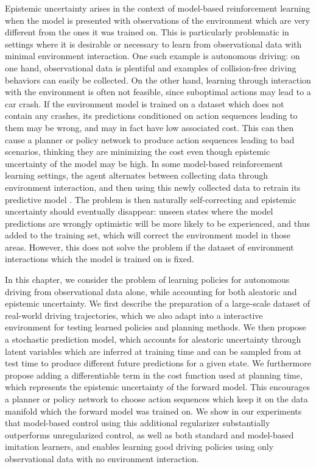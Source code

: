 \documentclass{article} %
\begin{document}
Epistemic uncertainty arises in the context of model-based reinforcement learning when the model is presented with observations of the environment which are very different from the ones it was trained on.
This is particularly problematic in settings where it is desirable or necessary to learn from observational data with minimal environment interaction.
One such example is autonomous driving: on one hand, observational data is plentiful and examples of collision-free driving behaviors can easily be collected.
On the other hand, learning through interaction with the environment is often not feasible, since suboptimal actions may lead to a car crash.
If the environment model is trained on a dataset which does not contain any crashes, its predictions conditioned on action sequences leading to them may be wrong, and may in fact have low associated cost.
This can then cause a planner or policy network to produce action sequences leading to bad scenarios, thinking they are minimizing the cost even though epistemic uncertainty of the model may be high.
In some model-based reinforcement learning settings, the agent alternates between collecting data through environment interaction, and then using this newly collected data to retrain its predictive model \citep{Dyna, PILCO}.
The problem is then naturally self-correcting and epistemic uncertainty should eventually disappear: unseen states where the model predictions are wrongly optimistic will be more likely to be experienced, and thus added to the training set, which will correct the environment model in those areas. However, this does not solve the problem if the dataset of environment interactions which the model is trained on is fixed.

In this chapter, we consider the problem of learning policies for autonomous driving from observational data alone, while accounting for both aleatoric and epistemic uncertainty.
We first describe the preparation of a large-scale dataset of real-world driving trajectories, which we also adapt into a interactive environment for testing learned policies and planning methods.
We then propose a stochastic prediction model, which accounts for aleatoric uncertainty through latent variables which are inferred at training time and can be sampled from at test time to produce different future predictions for a given state.
We furthermore propose adding a differentiable term in the cost function used at planning time, which represents the epistemic uncertainty of the forward model.
This encourages a planner or policy network to choose action sequences which keep it on the data manifold which the forward model was trained on.
We show in our experiments that model-based control using this additional regularizer substantially outperforms unregularized control, as well as both standard and model-based imitation learners, and enables learning good driving policies using only observational data with no environment interaction.
\end{document}
